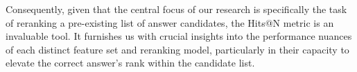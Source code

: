 Consequently, given that the central focus of our research is specifically the task of reranking a pre-existing list of answer candidates, the {Hits@N} metric is an invaluable tool. It furnishes us with crucial insights into the performance nuances of each distinct feature set and reranking model, particularly in their capacity to elevate the correct answer's rank within the candidate list.

